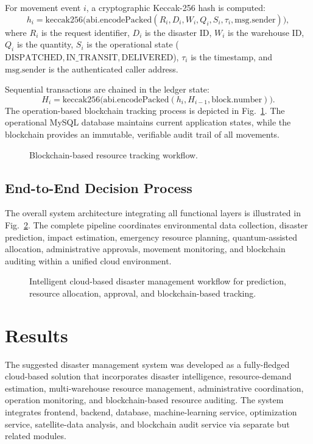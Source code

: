 \documentclass[conference]{IEEEtran}
\begin{document}
For movement event $i$, a cryptographic Keccak-256 hash is computed:
\begin{equation}
h_i = \text{keccak256}\Big(\text{abi.encodePacked}(R_i, D_i, W_i, Q_i, S_i, \tau_i, \text{msg.sender})\Big),
\label{eq:keccak}
\end{equation}
where $R_i$ is the request identifier, $D_i$ is the disaster ID, $W_i$ is the warehouse ID, $Q_i$ is the quantity, $S_i$ is the operational state ($\text{DISPATCHED}, \text{IN\_TRANSIT}, \text{DELIVERED}$), $\tau_i$ is the timestamp, and $\text{msg.sender}$ is the authenticated caller address.

Sequential transactions are chained in the ledger state:
\begin{equation}
H_i = \text{keccak256}\Big(\text{abi.encodePacked}(h_i, H_{i-1}, \text{block.number})\Big).
\label{eq:hash_chain}
\end{equation}
The operation-based blockchain tracking process is depicted in Fig.~\ref{fig:blockchain_workflow}. The operational MySQL database maintains current application states, while the blockchain provides an immutable, verifiable audit trail of all movements.

\begin{figure}[htbp]
\centering
\fbox{\rule{0pt}{1.8in} \rule{0.9\linewidth}{0pt}}
\caption{Blockchain-based resource tracking workflow.}
\label{fig:blockchain_workflow}
\end{figure}

\subsection{End-to-End Decision Process}
The overall system architecture integrating all functional layers is illustrated in Fig.~\ref{fig:system_arch}. The complete pipeline coordinates environmental data collection, disaster prediction, impact estimation, emergency resource planning, quantum-assisted allocation, administrative approvals, movement monitoring, and blockchain auditing within a unified cloud environment.

\begin{figure}[!t]
\centering
\fbox{\rule{0pt}{2.2in} \rule{0.95\linewidth}{0pt}}
\caption{Intelligent cloud-based disaster management workflow for prediction, resource allocation, approval, and blockchain-based tracking.}
\label{fig:system_arch}
\end{figure}

\section{Results}
The suggested disaster management system was developed as a fully-fledged cloud-based solution that incorporates disaster intelligence, resource-demand estimation, multi-warehouse resource management, administrative coordination, operation monitoring, and blockchain-based resource auditing. The system integrates frontend, backend, database, machine-learning service, optimization service, satellite-data analysis, and blockchain audit service via separate but related modules.
\end{document}

